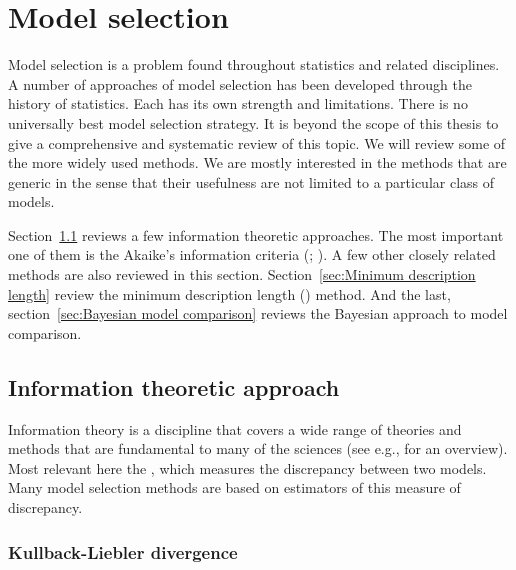 \chapter{Model selection}
\label{cha:Model selection}

Model selection is a problem found throughout statistics and related
disciplines. A number of approaches of model selection has been developed
through the history of statistics. Each has its own strength and limitations.
There is no universally best model selection strategy. It is beyond the scope
of this thesis to give a comprehensive and systematic review of this topic. We
will review some of the more widely used methods. We are mostly interested in
the methods that are generic in the sense that their usefulness are not
limited to a particular class of models.

Section~\ref{sec:Information theoretic approach} reviews a few information
theoretic approaches. The most important one of them is the Akaike's
information criteria (\aic; \cite{Akaike:1973uc,Akaike:1974ih}). A few other
closely related methods are also reviewed in this section.
Section~\ref{sec:Minimum description length} review the minimum description
length (\mdl) method. And the last, section~\ref{sec:Bayesian model
  comparison} reviews the Bayesian approach to model comparison.

\section{Information theoretic approach}
\label{sec:Information theoretic approach}

Information theory is a discipline that covers a wide range of theories and
methods that are fundamental to many of the sciences (see e.g.,
\cite{Cover:1991vx} for an overview). Most relevant here the \kld
\cite{Kullback:1951va}, which measures the discrepancy between two models.
Many model selection methods are based on estimators of this measure of
discrepancy.

\subsection{Kullback-Liebler divergence}
\label{sub:Kullback-Liebler divergence}

